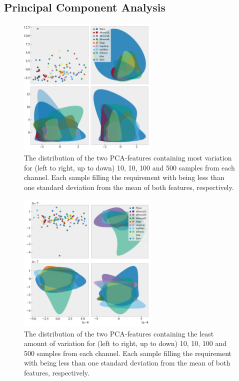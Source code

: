 \subsection{Principal Component Analysis}
\begin{figure}
    \centering
    \includegraphics[width=0.6\textwidth]{Figures/MLResults/DataHandling/PCA/PCAPlotFirst.pdf}
    \caption{The distribution of the two PCA-features containing most variation for (left to right, 
    up to down) 10, 10, 100 and 500 samples from each channel. Each sample filling the requirement 
    with being less than one standard deviation from the mean of both features, respectively.}
    \label{fig:PCA1}
\end{figure}
\begin{figure}
    \centering
    \includegraphics[width=0.6\textwidth]{Figures/MLResults/DataHandling/PCA/PCAPlotLast.pdf}
    \caption{The distribution of the two PCA-features containing the least amount of variation for (left to right, 
    up to down) 10, 10, 100 and 500 samples from each channel. Each sample filling the requirement 
    with being less than one standard deviation from the mean of both features, respectively.}
    \label{fig:PCA2}
\end{figure}


